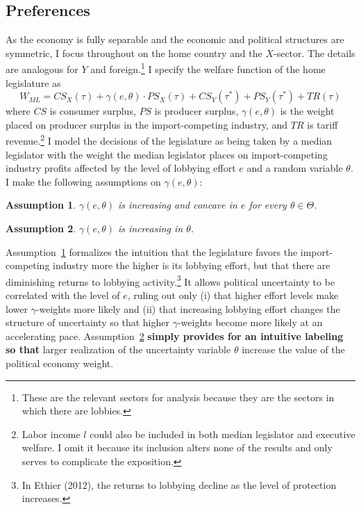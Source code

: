 \documentclass[10pt]{article}
\newtheorem{assumption}{Assumption}
\newcommand{\ve}{\theta}
\newcommand{\ta}{\theta}
\newcommand{\ga}{\gamma}
\begin{document}
\subsection{Preferences}
\label{sec:pref}
As the economy is fully separable and the economic and political structures are symmetric, I focus throughout on the home country and the $X$-sector. The details are analogous for $Y$ and foreign.\footnote{These are the relevant sectors for analysis because they are the sectors in which there are lobbies.} I specify the welfare function of the home legislature as
\begin{equation}
  W_{\mathit{ML}} = \mathit{CS}_X(\tau) + \ga(e,\ve) \cdot \mathit{PS}_X(\tau) + \mathit{CS}_Y(\tau^*) + \mathit{PS}_Y(\tau^*) + \mathit{TR}(\tau)
  \label{eq:ml}
\end{equation}
where $\mathit{CS}$ is consumer surplus, $\mathit{PS}$ is producer surplus, $\ga(e,\ta)$ is the weight placed on producer surplus in the import-competing industry, and $\mathit{TR}$ is tariff revenue.\footnote{Labor income $l$ could also be included in both median legislator and executive welfare. I omit it because its inclusion alters none of the results and only serves to complicate the exposition.} I model the decisions of the legislature as being taken by a median legislator with the weight the median legislator places on import-competing industry profits affected by the level of lobbying effort $e$ and a random variable $\ta$. I make the following assumptions on $\ga(e,\ta)$:

\begin{assumption}
  $\ga(e,\ta)$ is increasing and concave in $e$ for every $\ta \in \Theta$.
  \label{as:ga_c}
\end{assumption}

\begin{assumption}
  $\ga(e,\ta)$ is increasing in $\ta$.
  \label{as:ga_ta}
\end{assumption}

Assumption~\ref{as:ga_c} formalizes the intuition that the legislature favors the import-competing industry more the higher is its lobbying effort, but that there are diminishing returns to lobbying activity.\footnote{In Ethier (2012), the returns to lobbying decline as the level of protection increases.} It allows political uncertainty to be correlated with the level of $e$, ruling out only (i) that higher effort levels make lower $\ga$-weights more likely and (ii) that increasing lobbying effort changes the structure of uncertainty so that higher $\ga$-weights become more likely at an accelerating pace. Assumption~\ref{as:ga_ta} \textbf{simply provides for an intuitive labeling so that} larger realization of the uncertainty variable $\ta$ increase the value of the political economy weight.
\end{document}
